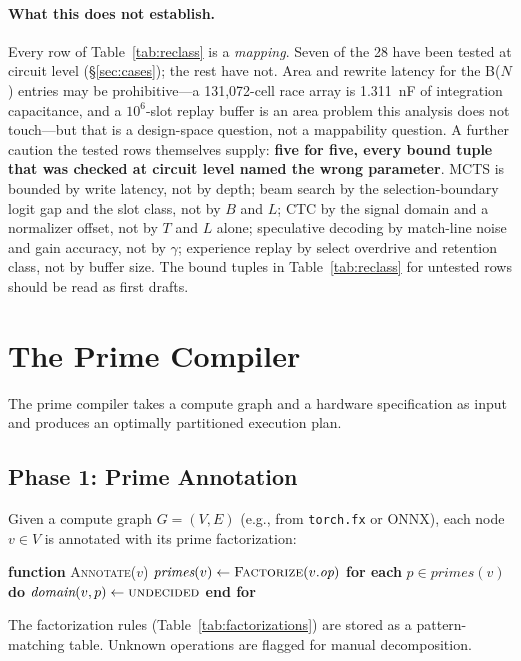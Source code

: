 \documentclass[11pt]{article}
\begin{document}
\paragraph{What this does not establish.} Every row of Table~\ref{tab:reclass} is a \textit{mapping}. Seven of the 28 have been tested at circuit level (\S\ref{sec:cases}); the rest have not. Area and rewrite latency for the B($N$) entries may be prohibitive---a 131{,}072-cell race array is 1.311~nF of integration capacitance, and a $10^6$-slot replay buffer is an area problem this analysis does not touch---but that is a design-space question, not a mappability question. A further caution the tested rows themselves supply: \textbf{five for five, every bound tuple that was checked at circuit level named the wrong parameter}. MCTS is bounded by write latency, not by depth; beam search by the selection-boundary logit gap and the slot class, not by $B$ and $L$; CTC by the signal domain and a normalizer offset, not by $T$ and $L$ alone; speculative decoding by match-line noise and gain accuracy, not by $\gamma$; experience replay by select overdrive and retention class, not by buffer size. The bound tuples in Table~\ref{tab:reclass} for untested rows should be read as first drafts.

\section{The Prime Compiler}
\label{sec:compiler}

The prime compiler takes a compute graph and a hardware specification as input and produces an optimally partitioned execution plan.

\subsection{Phase 1: Prime Annotation}

Given a compute graph $G = (V, E)$ (e.g., from \texttt{torch.fx} or ONNX), each node $v \in V$ is annotated with its prime factorization:

\begin{algorithmic}
\STATE \textbf{function} \textsc{Annotate}($v$)
\STATE \quad $\textit{primes}(v) \gets \textsc{Factorize}(v.\textit{op})$
\STATE \quad \textbf{for each} $p \in \textit{primes}(v)$ \textbf{do}
\STATE \quad \quad $\textit{domain}(v, p) \gets \textsc{undecided}$
\STATE \quad \textbf{end for}
\end{algorithmic}

The factorization rules (Table~\ref{tab:factorizations}) are stored as a pattern-matching table. Unknown operations are flagged for manual decomposition.
\end{document}
